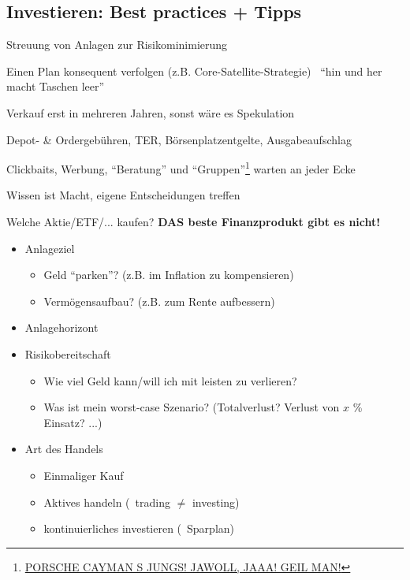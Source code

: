 \documentclass{beamer}
\begin{document}
		\subsection{Investieren: Best practices + Tipps}
		
			\begin{frame}
				\begin{description}[labelwidth=0cm]
					\item[Diversifikation] Streuung von Anlagen zur Risikominimierung\pause
					\item[Strategie] Einen Plan konsequent verfolgen (z.B. Core-Satellite-Strategie) \textrightarrow\  "`hin und her macht Taschen leer"'\pause
					\item[Geduld] Verkauf erst in mehreren Jahren, sonst wäre es Spekulation\pause
					\item[Gebühren] Depot- \& Ordergebühren, TER, Börsenplatzentgelte, Ausgabeaufschlag\pause
					\item[Nachdenken] Clickbaits, Werbung, "`Beratung"' und "`Gruppen"'\footnote{\href{https://www.youtube.com/watch?v=dM-8-KuKprA}{PORSCHE CAYMAN S JUNGS! JAWOLL, JAAA! GEIL MAN!}} warten an jeder Ecke\pause
					\item[Bildung] Wissen ist Macht, eigene Entscheidungen treffen
				\end{description}
			\end{frame}
		
			\begin{frame}{Welche Aktie/ETF/... kaufen?}
				\textbf{DAS beste Finanzprodukt gibt es nicht!}\pause
				\begin{itemize}
					\item Anlageziel
					\begin{itemize}
						\item Geld "`parken"'? (z.B. im Inflation zu kompensieren)
						\item Vermögensaufbau? (z.B. zum Rente aufbessern)
					\end{itemize}\pause
					\item Anlagehorizont\pause
					\item Risikobereitschaft
					\begin{itemize}
						\item Wie viel Geld kann/will ich mit leisten zu verlieren?
						\item Was ist mein worst-case Szenario? (Totalverlust? Verlust von $x$ \% Einsatz? ...)
					\end{itemize}\pause
					\item Art des Handels
					\begin{itemize}
						\item Einmaliger Kauf
						\item Aktives handeln (\textrightarrow\ trading $\neq$ investing)
						\item kontinuierliches investieren (\textrightarrow\ Sparplan)
					\end{itemize}
				\end{itemize}
			\end{frame}
		
\end{document}
